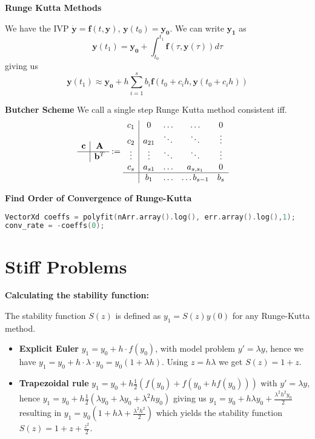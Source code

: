 \documentclass{sciposter}
\renewcommand{\vec}[1]{\mathbf{#1}}
\newcommand{\psection}[1]{\par \textbf{\large#1}}
\begin{document}
\begin{multicols}{2}
\psection{Runge Kutta Methods}

We have the IVP  $\dot{\vec{y}} = \vec{f}(t,\vec{y})$, $\vec{y}(t_0) = \vec{y_0}$. We can write $\vec{y_1}$ as $$\vec{y}(t_1) = \vec{y_0} + \int_{t_0}^{t_1} \vec{f}(\tau, \vec{y}(\tau)) d\tau $$
giving us
$$
\vec{y}(t_1) \approx \vec{y_0} + h\sum_{i=1}^{s} b_i \vec{f}(t_0 + c_i h , \vec{y}(t_0 + c_i h))
$$

\psection{Butcher Scheme}
We call a single step Runge Kutta method consistent iff. 
\begin{align*}
	\begin{array}
	{c|c}
	\vec{c} &  \vec{A} \\
	\hline
	& \vec{b}^T
	\end{array} &:= 
	\begin{array}{c|cccc}
	c_1 &  0 & \ldots & \ldots & 0  \\
	c_2 &  a_{21} & \ddots &\ddots & \vdots\\
	\vdots & \vdots& \ddots & \ddots & \vdots \\
	c_s & a_{s1} & \ldots & a_{s,s_1} & 0\\
	\hline
	& b_1 &\ldots & \ldots b_{s-1} & b_s
	\end{array} 
\end{align*}

\psection{Find Order of Convergence of Runge-Kutta}
\begin{lstlisting}[language=c++]
VectorXd coeffs = polyfit(nArr.array().log(), err.array().log(),1); 
conv_rate = -coeffs(0);
\end{lstlisting}



\section*{Stiff Problems}

\psection{Calculating the stability function:}

The stability function $S(z)$ is defined as $y_1 = S(z)y(0)$ for any Runge-Kutta method.

\begin{itemize}
	\item \textbf{Explicit Euler} $y_1 = y_0 + h\cdot f(y_0)$, with model problem $y' = \lambda y$, hence we have $y_1 = y_0 + h\cdot \lambda \cdot y_0 = y_0 \left(1 + \lambda h\right) $. Using $z = h \lambda$ we get $S(z) = 1 + z$.
	\item \textbf{Trapezoidal rule} $y_1 = y_0 + h\frac{1}{2}(f(y_0) + f(y_0 + hf(y_0)))$ with $y' = \lambda y$, hence $y_1 = y_0 + h\frac{1}{2}(\lambda y_0 + \lambda y_0 + \lambda^2 h y_0)$ giving us $y_1 = y_0 + h\lambda y_0 + \frac{\lambda^2 h^2 y_0}{2}$ resulting in $y_1 = y_0 \left( 1 + h\lambda + \frac{\lambda^2 h^2}{2}\right)$ which yields the stability function $S(z) = 1 + z + \frac{z^2}{2}$.
\end{itemize}



\end{multicols}
\end{document}
